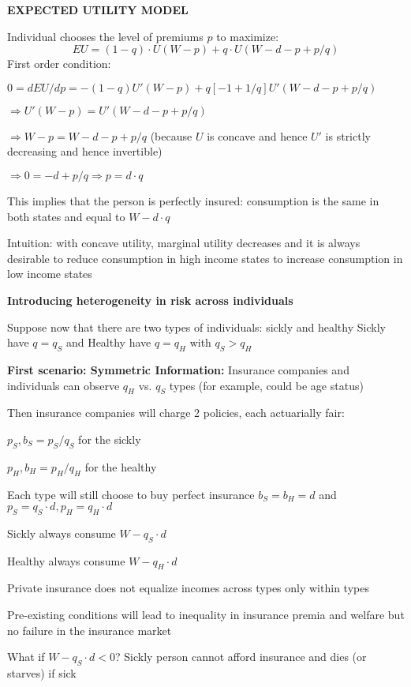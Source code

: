 \documentclass[landscape]{slides}
\begin{document}
\begin{slide}
\begin{center}
{\bf EXPECTED UTILITY MODEL}
\end{center}

Individual chooses the level of premiums $p$ to maximize:
\[EU=(1-q) \cdot U(W-p)+q \cdot U(W-d-p + p/q) \]
First order condition:

$0=dEU/dp=-(1-q)U'(W-p)+q[-1+1/q] U'(W-d- p + p/q )$

$\Rightarrow U'(W-p)=U'(W-d- p + p/q)$

$\Rightarrow W-p=W-d- p + p/q$ (because $U$ is concave and hence $U'$ is strictly
decreasing and hence invertible)

$\Rightarrow 0=-d +p/q \Rightarrow p= d \cdot q$

This implies that the person is perfectly insured: consumption is the same
in both states and equal to $W-d \cdot q$

\small
Intuition: with concave utility, marginal utility decreases and it is always
desirable to reduce consumption in high income states to increase
consumption in low income states

\end{slide}


\begin{slide}

\end{slide}

%


\begin{slide}
\begin{center}
{\bf Introducing heterogeneity in risk across individuals}
\end{center}
\small
Suppose now that there are two types of individuals: sickly and healthy
Sickly have $q=q_S$ and Healthy have $q=q_H$ with $q_S>q_H$

\textbf{First scenario: Symmetric Information:} Insurance companies and
individuals can observe $q_H$ vs. $q_S$ types (for example, could be age status)

Then insurance companies will charge 2 policies, each actuarially fair:

$p_S, b_S=p_S/q_S$ for the sickly

$p_H, b_H=p_H/q_H$ for the healthy

Each type will still choose to buy perfect insurance $b_S=b_H=d$ and $p_S=q_S  \cdot d, p_H=q_H \cdot d$

Sickly always consume $W-q_S \cdot d$

Healthy always consume $W-q_H \cdot d$

Private insurance does not equalize incomes across types only within
types

Pre-existing conditions will lead to inequality in insurance premia and welfare but no
failure in the insurance market

What if $W-q_S  \cdot d<0$? Sickly person cannot afford insurance and dies (or starves) if sick
\end{slide}
\end{document}
